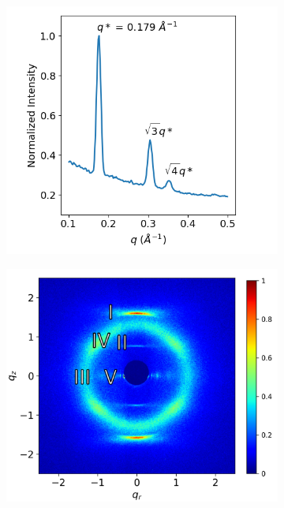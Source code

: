 \documentclass{article}
\begin{document}
  \begin{figure}
        \centering
        \begin{subfigure}[t]{0.43\linewidth}
                \centering
                \includegraphics[width=\linewidth]{SAXS.png}
                \caption{}\label{fig:SAXS}
        \end{subfigure}
        \begin{subfigure}[t]{0.47\linewidth}
                \centering
                \includegraphics[width=\linewidth]{WAXS_annotated.png} 

\end{subfigure}
\end{figure}
\end{document}
